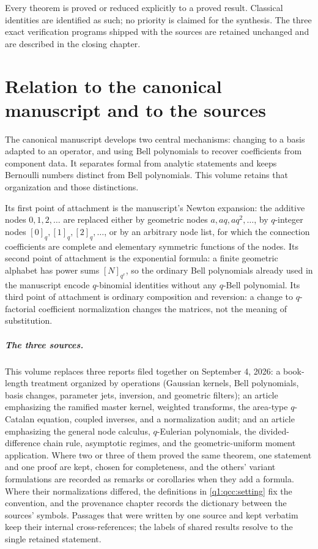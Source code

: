 \documentclass[11pt,a4paper,oneside,openany]{book}
\theoremstyle{definition}
\theoremstyle{remark}
\begin{document}
Every theorem is proved or reduced explicitly to a proved result. Classical
identities are identified as such; no priority is claimed for the synthesis.
The three exact verification programs shipped with the sources are retained
unchanged and are described in the closing chapter.

\chapter*{Relation to the canonical manuscript and to the sources}
The canonical manuscript \cite{ccc} develops two central mechanisms: changing
to a basis adapted to an operator, and using Bell polynomials to recover
coefficients from component data. It separates formal from analytic
statements and keeps Bernoulli numbers distinct from Bell polynomials. This
volume retains that organization and those distinctions.

Its first point of attachment is the manuscript's Newton expansion: the
additive nodes \(0,1,2,\ldots\) are replaced either by geometric nodes
\(a,aq,aq^2,\ldots\), by \(q\)-integer nodes \([0]_q,[1]_q,[2]_q,\ldots\), or
by an arbitrary node list, for which the connection coefficients are
complete and elementary symmetric functions of the nodes. Its second point of
attachment is the exponential formula: a finite geometric alphabet has power
sums \([N]_{q^r}\), so the ordinary Bell polynomials already used in the
manuscript encode \(q\)-binomial identities without any \(q\)-Bell
polynomial. Its third point of attachment is ordinary composition and
reversion: a change to \(q\)-factorial coefficient normalization changes the
matrices, not the meaning of substitution.

\paragraph{The three sources.}
This volume replaces three reports filed together on September 4, 2026:
a book-length treatment organized by operations (Gaussian kernels, Bell
polynomials, basis changes, parameter jets, inversion, and geometric
filters); an article emphasizing the ramified master kernel, weighted
transforms, the area-type \(q\)-Catalan equation, coupled inverses, and a
normalization audit; and an article emphasizing the general node calculus,
\(q\)-Eulerian polynomials, the divided-difference chain rule, asymptotic
regimes, and the geometric-uniform moment application. Where two or three of
them proved the same theorem, one statement and one proof are kept, chosen
for completeness, and the others' variant formulations are recorded as
remarks or corollaries when they add a formula. Where their normalizations
differed, the definitions in \cref{q1:qcc:setting} fix the convention, and
the provenance chapter records the dictionary between the sources' symbols.
Passages that were written by one source and kept verbatim keep their
internal cross-references; the labels of shared results resolve to the single
retained statement.
\end{document}

